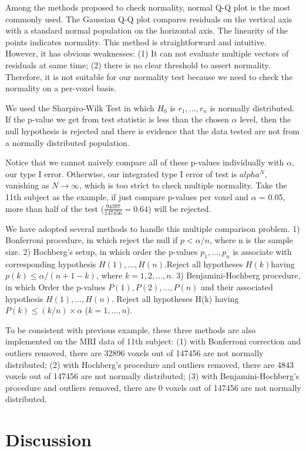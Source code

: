 \documentclass[11pt]{article}
\begin{document}
Among the methods proposed to check normality, normal Q-Q plot is the most
commonly used. The Gaussian Q-Q plot compares residuals on the vertical axis
with a standard normal population on the horizontal axis. The linearity of the
points indicates normality. This method is straightforward and
intuitive. However, it has obvious weaknesses: (1) It can not evaluate multiple
vectors of residuals at same time; (2) there is no clear threshold to assert
normality. Therefore, it is not suitable for our normality test because we need
to check the normality on a per-voxel basis.

We used the Sharpiro-Wilk Test in which $H_0$ is $r_1,\dots ,r_n$ is normally
distributed. If the p-value we get from test statistic is less than the chosen
$\alpha$ level, then the null hypothesis is rejected and there is evidence that
the data tested are not from a normally distributed population.

Notice that we cannot naively compare all of these p-values individually with
$\alpha$, our type I error. Otherwise, our integrated type I error of test is
$alpha^N$, vanishing as $N \rightarrow \infty$, which is too strict to check
multiple normality. Take the 11th subject as the example, if just compare
p-values per voxel and $\alpha$ = 0.05, more than half of the test
($\frac{94397}{147456} =0.64$) will be rejected.

We have adopted several methods to handle this multiple comparison problem. 1)
Bonferroni procedure, in which reject the null if $p< \alpha/n$, where n is the
sample size. 2) Hochberg’s setup, in which order the p-values $p_1,\dots,p_n$ is
associate with corresponding hypothesis $H(1), \dots, H(n)$.Reject all
hypotheses $H(k) $having $p(k)\leq \alpha/(n+1-k)$, where $ k=1,2,\dots,n$. 3)
Benjamini-Hochberg procedure, in which Order the p-values $P(1),P(2),\dots,P(n)$
and their associated hypothesis $H(1),\dots,H(n)$. Reject all hypotheses H(k)
having $P(k) \leq (k/n)\times \alpha $ ($k=1,\dots ,n$).

To be consistent with previous example, these three methods are also implemented
on the MRI data of 11th subject: (1) with Bonferroni correction and outliers
removed, there are 32896 voxels out of 147456 are not normally distributed; (2)
with Hochberg's procedure and outliers removed, there are 4843 voxels out of
147456 are not normally distributed; (3) with Benjamini-Hochberg's procedure and
outliers removed, there are 0 voxels out of 147456 are not normally distributed.


\section{Discussion}
\end{document}
